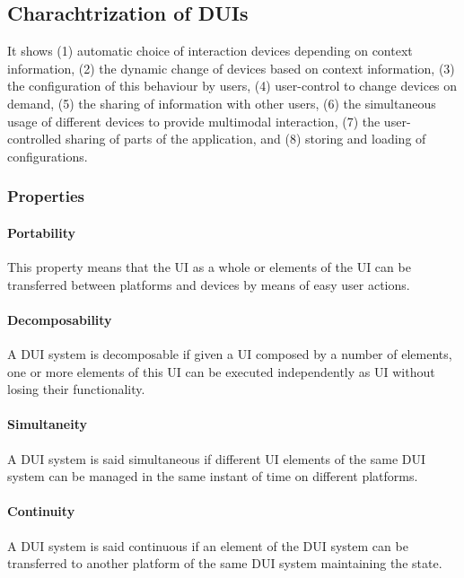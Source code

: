 \subsection{Charachtrization of DUIs}

\cite{blumendorf2011distributed} It shows (1) automatic choice of interaction
devices depending on context information, (2) the dynamic change of devices based on context information, (3) the configuration of this behaviour by users, (4) user-control to change devices on demand, (5) the sharing of information with other users, (6) the simultaneous usage of different devices to provide multimodal interaction, (7) the user- controlled sharing of parts of the application, and (8) storing and loading of configurations.\\


\subsubsection{Properties}

\paragraph{Portability} \cite{lopez2011formal} This property means that the UI
as a whole or elements of the UI can be transferred between platforms and
devices by means of easy user actions.\\

\paragraph{Decomposability}\cite{lopez2011formal}A DUI system is decomposable if
given a UI composed by a number of elements, one or more elements of this UI can be
executed independently as UI without losing their functionality.\\

\paragraph{Simultaneity}\cite{lopez2011formal}A DUI system is said simultaneous
if different UI elements of the same DUI system can be managed in the same
instant of time on different platforms.\\

\paragraph{Continuity}\cite{lopez2011formal}A DUI system is said continuous if
an element of the DUI system can be transferred to another platform of the same
DUI system maintaining the state.\\


